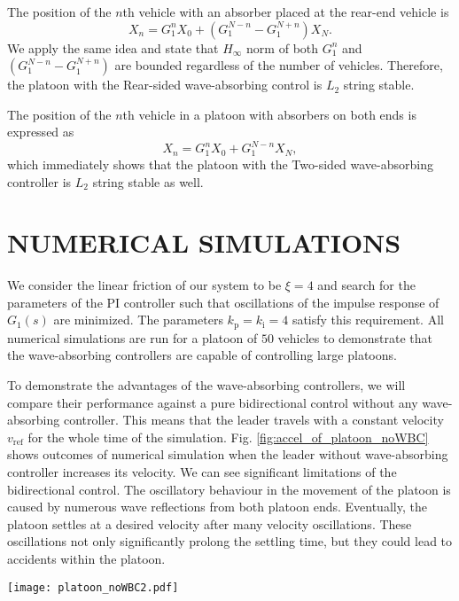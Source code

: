 \documentclass[final,5p,times,twocolumn]{elsarticle}
\begin{document}
The position of the $n$th vehicle with an absorber placed at the rear-end vehicle is
\begin{equation}
  X_{n} = G_1^{n}X_0 + (G_1^{N-n}-G_1^{N+n})X_{N}.
\end{equation}
We apply the same idea and state that $H_{\infty}$ norm of both $G_1^{n}$ and $(G_1^{N-n}-G_1^{N+n})$ are bounded regardless of the number of vehicles. Therefore, the platoon with the Rear-sided wave-absorbing control is $L_2$ string stable.

The position of the $n$th vehicle in a platoon with absorbers on both ends is expressed as
\begin{equation}
  X_n = G_1^n X_{0} +G_1^{N-n}X_{N},
\end{equation}
which immediately shows that the platoon with the Two-sided wave-absorbing controller is $L_2$ string stable as well.


\section{NUMERICAL SIMULATIONS}
We consider the linear friction of our system to be $\xi = 4$ and search for the parameters of the PI controller such that oscillations of the impulse response of $G_1(s)$ are minimized. The parameters $k_{\text{p}} = k_{\text{i}} = 4$ satisfy this requirement. All numerical simulations are run for a platoon of $50$ vehicles to demonstrate that the wave-absorbing controllers are capable of controlling large platoons.

To demonstrate the advantages of the wave-absorbing controllers, we will compare their performance against a pure bidirectional control without any wave-absorbing controller. This means that the leader travels with a constant velocity $v_{\text{ref}}$ for the whole time of the simulation. Fig. \ref{fig:accel_of_platoon_noWBC} shows outcomes of numerical simulation when the leader without wave-absorbing controller increases its velocity. We can see significant limitations of the bidirectional control. The oscillatory behaviour in the movement of the platoon is caused by numerous wave reflections from both platoon ends. Eventually, the platoon settles at a desired velocity after many velocity oscillations. These oscillations not only significantly prolong the settling time, but they could lead to accidents within the platoon.

\begin{figure*}[!htbp]
 \centering
   \texttt{[image: platoon\_noWBC2.pdf]}
  \caption{Simulation of the platoon without the wave-absorbing controller when the leader accelerates to velocity $v_{\text{ref}} = 1\,\text{ms}^{-1}$. The reference distance is kept fixed, $d_{\text{ref}} = 1\,\text{m}$, for the whole time.}
  \label{fig:accel_of_platoon_noWBC}
\end{figure*}
\end{document}

